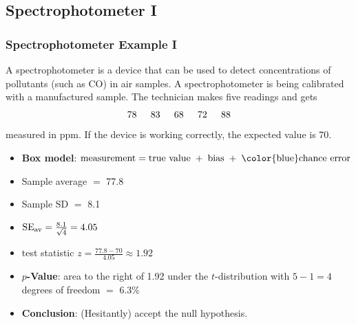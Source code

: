 \documentclass[t]{beamer}
\begin{document}
\subsection{Spectrophotometer I}
\begin{frame}
\frametitle{Spectrophotometer Example I}

{\small

A spectrophotometer is a device that can be used to detect concentrations of 
pollutants (such as CO) in air samples.  
A  spectrophotometer is being calibrated with a manufactured sample.  
The technician makes five readings and gets\vspace{-4pt}
\[78 \hspace{.2in} 83\hspace{.2in} 68\hspace{.2in} 72\hspace{.2in} 88\vspace{-4pt}\]
measured in ppm.  If the device is working correctly, the expected value is 70.
\begin{itemize}
\item \textbf{\color{blue}Box model}: $\mbox{measurement} = \mbox{true value}\; +\; \mbox{bias}\; + \;
     \mbox{\color{blue}chance error}$
\item  Sample average $=$ 77.8
\item  Sample SD $=$ 8.1
\item  $\mbox{SE}_{\mbox{\scriptsize av}} = \frac{8.1}{\sqrt{4}} = 4.05$
\item test statistic $\displaystyle z =\frac{77.8 - 70}{4.05} \approx 1.92$
\item \textbf{\color{blue}$p$-Value}: area to the right of 1.92 under the $t$-distribution with $5-1 = 4$
     degrees of freedom $=$ 6.3\%
\item \textbf{\color{blue}Conclusion}: (Hesitantly) accept the null hypothesis.
\end{itemize}}

\end{frame}
\end{document}
